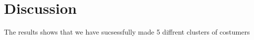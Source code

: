 \section{Discussion}

The results shows that we have sucsessfully made 5 diffrent clusters of costumers


